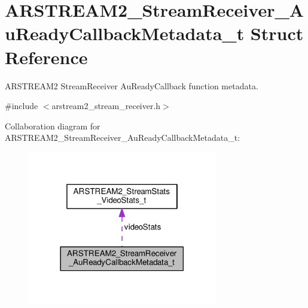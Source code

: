 \hypertarget{struct_a_r_s_t_r_e_a_m2___stream_receiver___au_ready_callback_metadata__t}{}\section{A\+R\+S\+T\+R\+E\+A\+M2\+\_\+\+Stream\+Receiver\+\_\+\+Au\+Ready\+Callback\+Metadata\+\_\+t Struct Reference}
\label{struct_a_r_s_t_r_e_a_m2___stream_receiver___au_ready_callback_metadata__t}


A\+R\+S\+T\+R\+E\+A\+M2 Stream\+Receiver Au\+Ready\+Callback function metadata.  




{\ttfamily \#include $<$arstream2\+\_\+stream\+\_\+receiver.\+h$>$}



Collaboration diagram for A\+R\+S\+T\+R\+E\+A\+M2\+\_\+\+Stream\+Receiver\+\_\+\+Au\+Ready\+Callback\+Metadata\+\_\+t\+:
\nopagebreak
\begin{figure}[H]
\begin{center}
\leavevmode
\includegraphics[width=234pt]{struct_a_r_s_t_r_e_a_m2___stream_receiver___au_ready_callback_metadata__t__coll__graph}
\end{center}
\end{figure}

